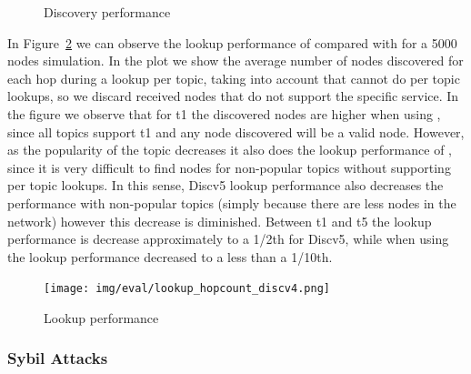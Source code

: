 \begin{figure}[!h]
\centering
{} 
\hspace{-0.25cm}
 \caption{Discovery performance} 
\label{fig:discovery}
\vspace{-0.15in}
\end{figure}   


In Figure~\ref{fig:hopcount} we can observe the lookup performance of \sysname compared with \discv for a 5000 nodes simulation.
In the plot we show the average number of nodes discovered for each hop during a lookup per topic, taking into account that \discv cannot do per topic lookups,  so we discard received nodes that do not support the specific service.
In the figure we observe that for t1 the discovered nodes are higher when using \discv, since all topics support t1 and any node discovered will be a valid node. 
However, as the popularity of the topic decreases it also does the lookup performance of \discv,  since it is very difficult to find nodes for non-popular topics without supporting per topic lookups.
In this sense,  Discv5 lookup performance also decreases the performance with non-popular topics (simply because there are less nodes in the network) however this decrease is diminished.  Between t1 and t5 the lookup performance is decrease approximately to a 1/2th for Discv5, while when using \discv the lookup performance decreased to a less than a 1/10th.


\begin{figure}[h!]
\centering
\texttt{[image: img/eval/lookup\_hopcount\_discv4.png]}
\caption{Lookup performance}
\label{fig:hopcount}
\vspace{-0.15in}
\end{figure}

\subsubsection{Sybil Attacks}

